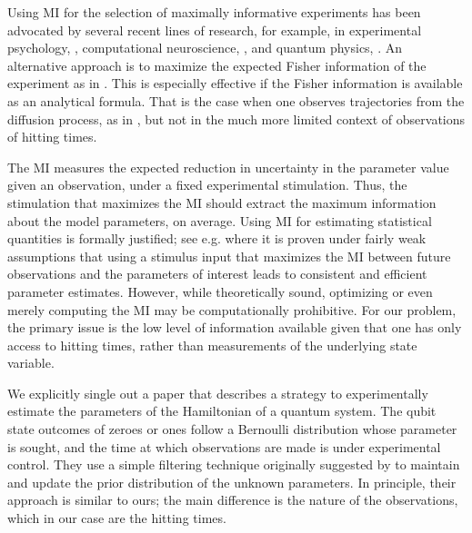 Using MI for the selection of maximally informative experiments has been
advocated by several recent lines of research, for example, in experimental
psychology, \cite{Cavagnaro2010,Myung2013}, computational neuroscience,
\cite{Paninski2006a,Paninski2005,Lewi2009}, and quantum physics,
\cite{Granade2012}. An alternative approach is to maximize the expected Fisher
information of the experiment as in \cite{Hooker2015}. This is especially
effective if the Fisher information is available as an analytical formula. That
is the case when one observes trajectories from the diffusion process, as in
\cite{Hooker2015}, but not in the much more limited context of observations of
hitting times.
 
The MI measures the expected reduction in uncertainty in the parameter value
given an observation, under a fixed experimental stimulation. Thus, the
stimulation that maximizes the MI should extract the maximum information about
the model parameters, on average. Using MI for estimating statistical quantities
is formally justified; see e.g. \cite{Paninski2005} where it is proven under
fairly weak assumptions that using a stimulus input that maximizes the MI
between future observations and the parameters of interest leads to consistent
and efficient parameter estimates. However, while theoretically sound,
optimizing or even merely computing the MI may be computationally prohibitive.
For our problem, the primary issue is the low level of information available
given that one has only access to hitting times, rather than measurements of the
underlying state variable.

We explicitly single out a paper \cite{Granade2012} that describes a strategy to
experimentally estimate the parameters of the Hamiltonian of a quantum system.
The qubit state outcomes of zeroes or ones follow a Bernoulli distribution whose
parameter is sought, and the time at which observations are made is under
experimental control. They use a simple filtering technique originally suggested
by \cite{Liu2001} to maintain and update the prior distribution of the unknown
parameters. In principle, their approach is similar to ours; the main difference
is the nature of the observations, which in our case are the hitting times.

